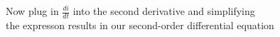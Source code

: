 \documentclass[preview]{standalone}
\begin{document}
\begin{center}
\raggedright
                Now plug in $\frac{di}{dt}$ into the second derivative and simplifying \\
             the expresson results in our second-order differential equation
\end{center}
\end{document}
